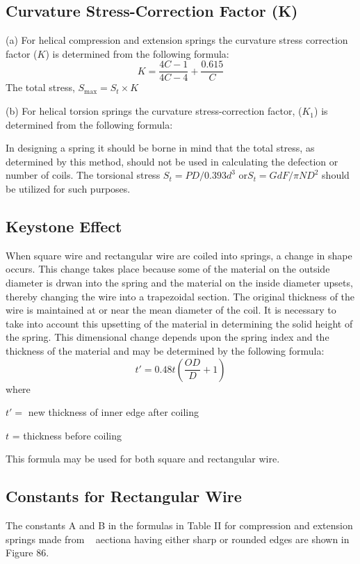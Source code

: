 \documentclass[10pt]{article}
\begin{document}
\subsection{Curvature Stress-Correction Factor (K)} %
(a) For helical compression and extension springs the curvature stress correction factor ($K$) is determined from the following formula:
$$ K = \frac{4C - 1}{4 C - 4} + \frac{0.615}{C} $$
The total stress, $S_\mathrm{max} = S_t \times K$

(b) For helical torsion springs the curvature stress-correction factor, ($K_1$) is determined from the following formula:


In designing a spring it should be borne in mind that the total stress, as determined by this method, should not be used in calculating the defection or number of coils. 
The torsional stress $S_t = PD/0.393 d^3$ or$ S_t = G d F/ \pi N D^2$ should be utilized for such purposes.

\subsection{Keystone Effect} %
When square wire and rectangular wire are coiled into springs, a change in shape occurs. 
This change takes place because some of the material on the outside diameter is drwan into the spring and the material on the inside diameter upsets, thereby changing the wire into a trapezoidal section. 
The original thickness of the wire is maintained at or near the mean diameter of the coil.
It is necessary to take into account this upsetting of the material in determining the solid height of the spring. 
This dimensional change depends upon the spring index and the thickness of the material and may be determined by the following formula:
$$ t' = 0.48t \left( \frac{OD}{D} + 1 \right) $$
where

$t' = $ new thickness of inner edge after coiling

$t$ = thickness before coiling

This formula may be used for both square and rectangular wire.

\subsection{Constants for Rectangular Wire} %
The constants A and B in the formulas in Table II for compression and extension springs made from ~ aectiona
having either sharp or rounded edges are shown in Figure 86.
\end{document}
